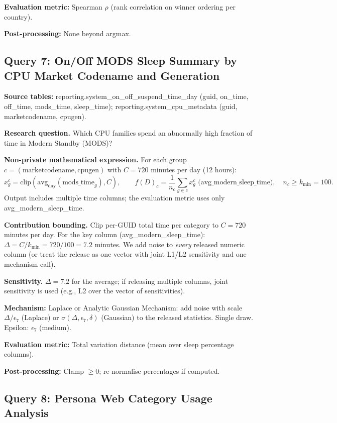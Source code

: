 \documentclass[12pt,letterpaper]{article}
\begin{document}
\textbf{Evaluation metric:} Spearman $\rho$ (rank correlation on winner ordering per country).

\textbf{Post-processing:} None beyond argmax.

\subsection{Query 7: On/Off MODS Sleep Summary by CPU Market Codename and Generation}
\label{sec:q7}

\textbf{Source tables:} reporting.system\_on\_off\_suspend\_time\_day (guid, on\_time, off\_time, mods\_time, sleep\_time); reporting.system\_cpu\_metadata (guid, marketcodename, cpugen).

\textbf{Research question.} Which CPU families spend an abnormally high fraction of time in Modern Standby (MODS)?

\textbf{Non-private mathematical expression.} For each group $c = (\text{marketcodename}, \text{cpugen})$ with $C = 720$ minutes per day (12 hours):
\[
x_g^c = \text{clip}(\text{avg}_{\text{day}}(\text{mods\_time}_g), C), \qquad
f(D)_c = \frac{1}{n_c} \sum_{g \in c} x_g^c \text{ (avg\_modern\_sleep\_time)}, \quad n_c \geq k_{\min} = 100.
\]
Output includes multiple time columns; the evaluation metric uses only avg\_modern\_sleep\_time.

\textbf{Contribution bounding.} Clip per-GUID total time per category to $C = 720$ minutes per day. For the key column (avg\_modern\_sleep\_time): $\Delta = C/k_{\min} = 720/100 = 7.2$ minutes. We add noise to \emph{every} released numeric column (or treat the release as one vector with joint L1/L2 sensitivity and one mechanism call).

\textbf{Sensitivity.} $\Delta = 7.2$ for the average; if releasing multiple columns, joint sensitivity is used (e.g., L2 over the vector of sensitivities).

\textbf{Mechanism:} Laplace or Analytic Gaussian Mechanism: add noise with scale $\Delta/\epsilon_7$ (Laplace) or $\sigma(\Delta,\epsilon_7,\delta)$ (Gaussian) to the released statistics. Single draw. Epsilon: $\epsilon_7$ (medium).

\textbf{Evaluation metric:} Total variation distance (mean over sleep percentage columns).

\textbf{Post-processing:} Clamp $\geq 0$; re-normalise percentages if computed.

\subsection{Query 8: Persona Web Category Usage Analysis}
\label{sec:q8}
\end{document}
